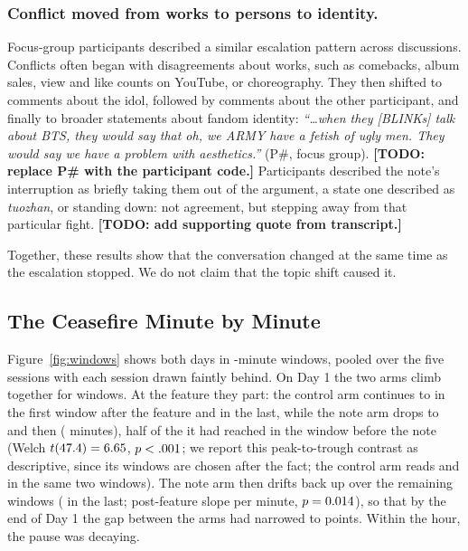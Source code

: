 \documentclass[manuscript,screen,review,anonymous]{acmart}
\newcommand{\todonote}[1]{\textcolor{orange!80!black}{\textbf{[TODO: #1]}}}
\begin{document}
\subsubsection{Conflict moved from works to persons to identity.}
Focus-group participants described a similar escalation pattern across
discussions. Conflicts often began with disagreements about works, such as
comebacks, album sales, view and like counts on YouTube, or choreography.
They then shifted to comments about the idol, followed by comments about the
other participant, and finally to broader statements about fandom identity:
\textit{``\ldots when they [BLINKs] talk about BTS, they would say that oh,
we ARMY have a fetish of ugly men. They would say we have a problem with
aesthetics.''} (P\#, focus group). \todonote{replace P\# with the participant
code.} Participants described the note's interruption as briefly taking them
out of the argument, a state one described as \textit{tuozhan}, or standing
down: not agreement, but stepping away from that particular fight.
\todonote{add supporting quote from transcript.}

Together, these results show that the conversation changed at the same time
as the escalation stopped. We do not claim that the topic shift caused it.

\subsection{The Ceasefire Minute by Minute}

Figure~\ref{fig:windows} shows both days in \StatwindowMin-minute windows,
pooled over the five sessions with each session drawn faintly behind. On
Day 1 the two arms climb together for \StatnPreWindows{} windows. At the
feature they part: the control arm continues to \StatctrlWinFirstPost{} in
the first window after the feature and \StatctrlWinLast{} in the last,
while the note arm drops to \StatexptWinFirstPost{} and then
\StatexptWinPostMin{} (\StatexptWinPostMinLabel{} minutes), half of the
\StatexptWinPreMax{} it had reached in the window before the note (Welch
$t(47.4)=6.65$, $p<.001$; we report
this peak-to-trough contrast as descriptive, since its windows are chosen
after the fact; the control arm reads \StatctrlAtPeakWin{} and
\StatctrlAtTroughWin{} in the same two windows). The note arm then drifts
back up over the remaining windows (\StatexptWinPostMax{} in the last;
post-feature slope \StatexptPostSlope{} per minute, $p=0.014$),
so that by the end of Day 1 the gap between the arms had narrowed to
\StatlastWinGap{} points. Within the hour, the pause was decaying.
\end{document}
